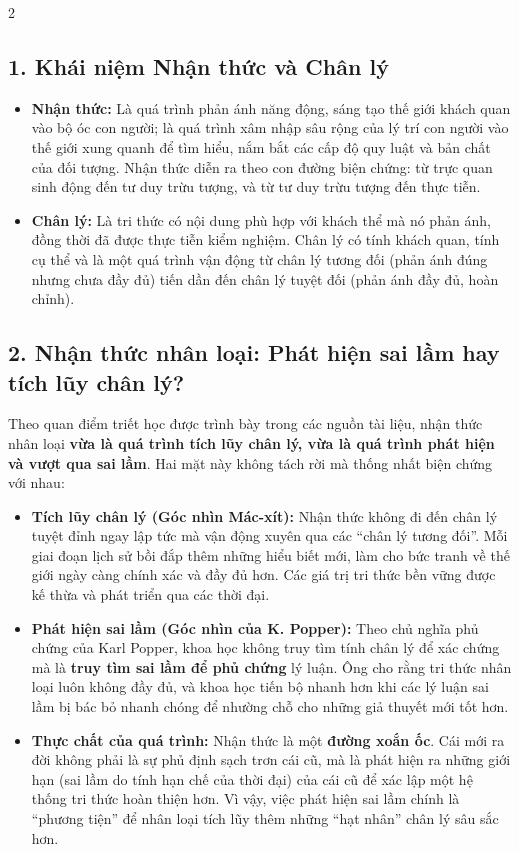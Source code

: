 \documentclass[9pt,a4paper]{extarticle}
\begin{document}
\begin{multicols*}{2}
\subsection*{1. Khái niệm Nhận thức và Chân lý}

\begin{itemize}
\item \textbf{Nhận thức:} Là quá trình phản ánh năng động, sáng tạo thế giới khách quan vào bộ óc con người; là quá trình xâm nhập sâu rộng của lý trí con người vào thế giới xung quanh để tìm hiểu, nắm bắt các cấp độ quy luật và bản chất của đối tượng. Nhận thức diễn ra theo con đường biện chứng: từ trực quan sinh động đến tư duy trừu tượng, và từ tư duy trừu tượng đến thực tiễn.
\item \textbf{Chân lý:} Là tri thức có nội dung phù hợp với khách thể mà nó phản ánh, đồng thời đã được thực tiễn kiểm nghiệm. Chân lý có tính khách quan, tính cụ thể và là một quá trình vận động từ chân lý tương đối (phản ánh đúng nhưng chưa đầy đủ) tiến dần đến chân lý tuyệt đối (phản ánh đầy đủ, hoàn chỉnh).
\end{itemize}

\subsection*{2. Nhận thức nhân loại: Phát hiện sai lầm hay tích lũy chân lý?}

Theo quan điểm triết học được trình bày trong các nguồn tài liệu, nhận thức nhân loại \textbf{vừa là quá trình tích lũy chân lý, vừa là quá trình phát hiện và vượt qua sai lầm}. Hai mặt này không tách rời mà thống nhất biện chứng với nhau:

\begin{itemize}
\item \textbf{Tích lũy chân lý (Góc nhìn Mác-xít):} Nhận thức không đi đến chân lý tuyệt đỉnh ngay lập tức mà vận động xuyên qua các ``chân lý tương đối''. Mỗi giai đoạn lịch sử bồi đắp thêm những hiểu biết mới, làm cho bức tranh về thế giới ngày càng chính xác và đầy đủ hơn. Các giá trị tri thức bền vững được kế thừa và phát triển qua các thời đại.
\item \textbf{Phát hiện sai lầm (Góc nhìn của K. Popper):} Theo chủ nghĩa phủ chứng của Karl Popper, khoa học không truy tìm tính chân lý để xác chứng mà là \textbf{truy tìm sai lầm để phủ chứng} lý luận. Ông cho rằng tri thức nhân loại luôn không đầy đủ, và khoa học tiến bộ nhanh hơn khi các lý luận sai lầm bị bác bỏ nhanh chóng để nhường chỗ cho những giả thuyết mới tốt hơn.
\item \textbf{Thực chất của quá trình:} Nhận thức là một \textbf{đường xoắn ốc}. Cái mới ra đời không phải là sự phủ định sạch trơn cái cũ, mà là phát hiện ra những giới hạn (sai lầm do tính hạn chế của thời đại) của cái cũ để xác lập một hệ thống tri thức hoàn thiện hơn. Vì vậy, việc phát hiện sai lầm chính là ``phương tiện'' để nhân loại tích lũy thêm những ``hạt nhân'' chân lý sâu sắc hơn.
\end{itemize}


\end{multicols*}
\end{document}
